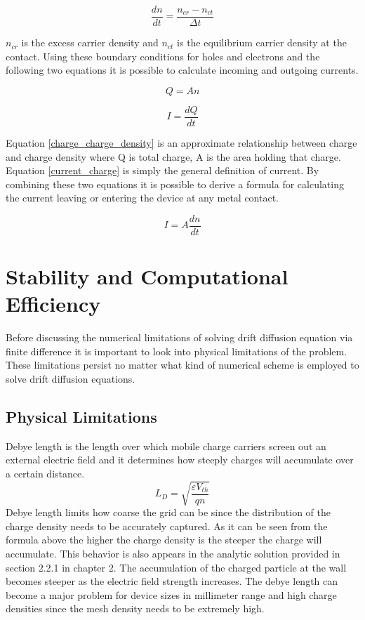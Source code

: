 \begin{doublespace}
\begin{equation}
\frac{dn}{dt}=\frac{n_{cr}-n_{ct}}{\Delta t}
\end{equation}

$n_{cr}$ is the excess carrier density and $n_{ct}$ is the equilibrium carrier density at the contact. Using these boundary conditions for holes and electrons and the following two equations it is possible to calculate incoming and outgoing currents. 

\begin{equation}
Q=An
\label{charge_charge_density}
\end{equation} 

\begin{equation}
I=\frac{dQ}{dt}
\label{current_charge}
\end{equation} 
 

Equation \ref{charge_charge_density} is an approximate relationship between charge and charge density where Q is total charge, A is the area holding that charge. Equation \ref{current_charge} is simply the general definition of current. By combining these two equations it is possible to derive a formula for calculating the current leaving or entering the device at any metal contact.

\begin{equation}
I=A \frac{dn}{dt}
\label{current_charge_density}
\end{equation}


\section{Stability and Computational Efficiency}
Before discussing  the numerical limitations of solving drift diffusion equation via finite difference it is important to look into physical limitations of the problem. These limitations persist no matter what kind of numerical scheme is employed to solve drift diffusion equations.

\subsection{Physical Limitations}
Debye length is the length over which mobile charge carriers screen out an external electric field and it determines how steeply charges will accumulate over a certain distance.
\begin{equation}
L_D=\sqrt{\frac{\varepsilon V_{th}}{q n}}
\label{debye}
\end{equation}
Debye length limits how coarse the grid can be since the distribution of the charge density needs to be accurately captured. As it can be seen from the formula above the higher the charge density is the steeper the charge will accumulate. This behavior is also appears in the analytic solution provided in section 2.2.1 in chapter 2. The accumulation of the charged particle at the wall becomes steeper as the electric field strength increases. The debye length can become a major problem for device sizes in millimeter range and high charge densities since the mesh density needs to be extremely high.


\end{doublespace}
